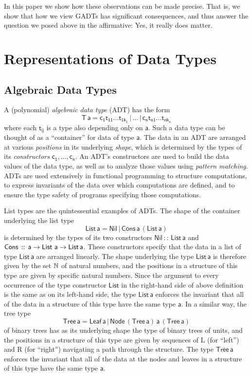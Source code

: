 \documentclass[acmsmall,screen,review,anonymous]{acmart}
\theoremstyle{definition}
\begin{document}
In this paper we show how these observations can be made precise. That
is, we show that how we view GADTs has significant consequences, and
thus answer the question we posed above in the affirmative: Yes, it
really does matter.

\section{Representations of Data Types}

\subsection{Algebraic Data Types}

A (polynomial) {\em algebraic data type} (ADT) has the form
\[\mathsf{T\,a} = \mathsf{c_1 t_{11}}...\mathsf{t_{1k_1}}\, |\, ...\, |\,
\mathsf{c_n t_{n1}}...\mathsf{t_{nk_n}}\] where each $\mathsf{t_{ij}}$
is a type also depending only on $\mathsf{a}$. Such a data type can be
thought of as a ``container'' for data of type $\mathsf{a}$. The data
in an ADT are arranged at various {\em positions} in its underlying
{\em shape}, which is determined by the types of its {\em
  constructors} $\mathsf{c_1},...,\mathsf{c_n}$. An ADT's constructors
are used to build the data values of the data type, as well as to
analyze those values using {\em pattern matching}. ADTs are used
extensively in functional programming to structure computations, to
express invariants of the data over which computations are defined,
and to ensure the type safety of programs specifying those
computations.

List types are the quintessential examples of ADTs. The shape of the
container underlying the list type
\[\mathsf{List\,a} = \mathsf{Nil} \,|\, \mathsf{Cons\,a\,(List\,a)}\]
is determined by the types of its two constructors $\mathsf{Nil\, ::\,
  List\, a}$ and $\mathsf{Cons \,::\,a \to \mathsf{List}\,\,a\to
  List\,a}$. These constructors specify that the data in a list of
type $\mathsf{List\,a}$ are arranged linearly. The shape underlying
the type $\mathsf{List\,a}$ is therefore given by the set $\mathbb{N}$ of
natural numbers, and the positions in a structure of this type are
given by specific natural numbers. Since the argument to every
occurrence of the type constructor $\mathsf{List}$ in the right-hand
side of above definition is the same as on its left-hand side, the
type $\mathsf{List\,a}$ enforces the invariant that all of the data in
a structure of this type have the same type $\mathsf{a}$. In a similar
way, the tree type
\[\mathsf{Tree\, a} = \mathsf{Leaf\,a}
\,|\,\mathsf{Node\,(Tree\,a)\,a\,(Tree\,a)}\] of binary trees
has as its underlying shape the type of binary trees of units, and the
positions in a structure of this type are given by sequences of L (for
``left'') and R (for ``right'') navigating a path
through the structure. The type $\mathsf{Tree\, a}$ enforces the
invariant that all of the data at the nodes and leaves in a structure
of this type have the same type $\mathsf{a}$.
\end{document}

